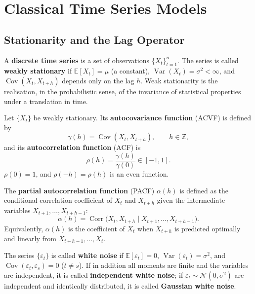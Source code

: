 \section{Classical Time Series Models}

\subsection{Stationarity and the Lag Operator}

\begin{definition}\label{def:ts_stationarity}
A \textbf{discrete time series} is a set of observations $\{X_t\}_{t=1}^n$. The series is called \textbf{weakly stationary} if $\mathbb{E}[X_t] = \mu$ (a constant), $\operatorname{Var}(X_t) = \sigma^2 < \infty$, and $\operatorname{Cov}(X_t, X_{t+h})$ depends only on the lag $h$. Weak stationarity is the realisation, in the probabilistic sense, of the invariance of statistical properties under a translation in time.
\end{definition}

\begin{definition}\label{def:ts_acf}
Let $\{X_t\}$ be weakly stationary. Its \textbf{autocovariance function} (ACVF) is defined by
\[
\gamma(h)=\operatorname{Cov}(X_t,X_{t+h}),\qquad h\in\mathbb{Z},
\]
and its \textbf{autocorrelation function} (ACF) is
\[
\rho(h)=\frac{\gamma(h)}{\gamma(0)}\in[-1,1].
\]
$\rho(0)=1$, and $\rho(-h)=\rho(h)$ is an even function.
\end{definition}

\begin{definition}\label{def:ts_pacf}
The \textbf{partial autocorrelation function} (PACF) $\alpha(h)$ is defined as the conditional correlation coefficient of $X_t$ and $X_{t+h}$ given the intermediate variables $X_{t+1},\dots,X_{t+h-1}$:
\[
\alpha(h)=\operatorname{Corr}\bigl(X_t,X_{t+h}\mid X_{t+1},\dots,X_{t+h-1}\bigr).
\]
Equivalently, $\alpha(h)$ is the coefficient of $X_t$ when $X_{t+h}$ is predicted optimally and linearly from $X_{t+h-1},\dots,X_t$.
\end{definition}

\begin{definition}\label{def:ts_white_noise}
The series $\{\varepsilon_t\}$ is called \textbf{white noise} if $\mathbb{E}[\varepsilon_t]=0$, $\operatorname{Var}(\varepsilon_t)=\sigma^2$, and $\operatorname{Cov}(\varepsilon_t,\varepsilon_s)=0$ ($t\neq s$). If in addition all moments are finite and the variables are independent, it is called \textbf{independent white noise}; if $\varepsilon_t\sim\mathcal{N}(0,\sigma^2)$ are independent and identically distributed, it is called \textbf{Gaussian white noise}.
\end{definition}

